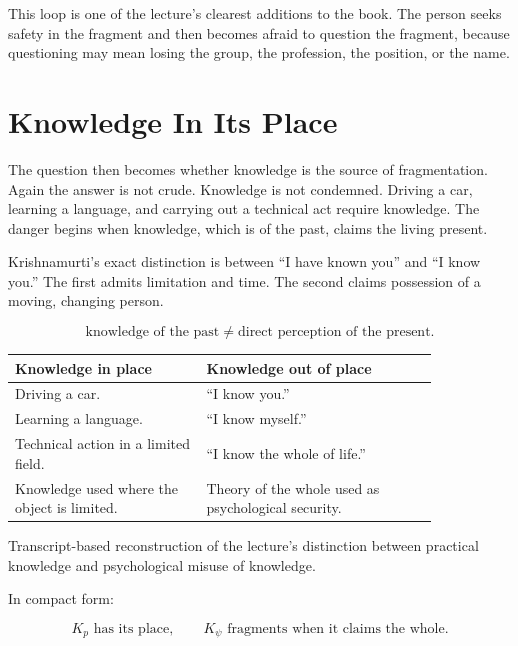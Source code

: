 \documentclass[11pt,oneside]{book}
\begin{document}
This loop is one of the lecture's clearest additions to the book. The person seeks safety in the fragment and then becomes afraid to question the fragment, because questioning may mean losing the group, the profession, the position, or the name.

\section{Knowledge In Its Place}

The question then becomes whether knowledge is the source of fragmentation. Again the answer is not crude. Knowledge is not condemned. Driving a car, learning a language, and carrying out a technical act require knowledge. The danger begins when knowledge, which is of the past, claims the living present.

Krishnamurti's exact distinction is between ``I have known you'' and ``I know you.'' The first admits limitation and time. The second claims possession of a moving, changing person.

\begin{equation}
\text{knowledge of the past}
\neq
\text{direct perception of the present}.
\end{equation}

\begin{table}
\centering
\begin{tabular}{|p{0.38\linewidth}|p{0.46\linewidth}|}
\hline
\textbf{Knowledge in place} & \textbf{Knowledge out of place}\\
\hline
Driving a car. & ``I know you.''\\
\hline
Learning a language. & ``I know myself.''\\
\hline
Technical action in a limited field. & ``I know the whole of life.''\\
\hline
Knowledge used where the object is limited. & Theory of the whole used as psychological security.\\
\hline
\end{tabular}

Transcript-based reconstruction of the lecture's distinction between practical knowledge and psychological misuse of knowledge.
\end{table}

In compact form:

\begin{equation}
K_p \text{ has its place},
\qquad
K_{\psi} \text{ fragments when it claims the whole}.
\end{equation}
\end{document}
